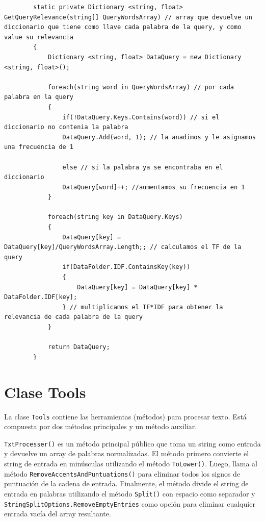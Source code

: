 \documentclass[12pt,a4paper]{report}
\begin{document}
\begin{lstlisting}
        static private Dictionary <string, float> GetQueryRelevance(string[] QueryWordsArray) // array que devuelve un diccionario que tiene como llave cada palabra de la query, y como value su relevancia
        {   
            Dictionary <string, float> DataQuery = new Dictionary <string, float>();

            foreach(string word in QueryWordsArray) // por cada palabra en la query
            {
                if(!DataQuery.Keys.Contains(word)) // si el diccionario no contenia la palabra
                DataQuery.Add(word, 1); // la anadimos y le asignamos una frecuencia de 1
 
                else // si la palabra ya se encontraba en el diccionario
                DataQuery[word]++; //aumentamos su frecuencia en 1
            }

            foreach(string key in DataQuery.Keys)
            {
                DataQuery[key] = DataQuery[key]/QueryWordsArray.Length;; // calculamos el TF de la query
                if(DataFolder.IDF.ContainsKey(key))
                {
                    DataQuery[key] = DataQuery[key] * DataFolder.IDF[key];
                } // multiplicamos el TF*IDF para obtener la relevancia de cada palabra de la query
            }

            return DataQuery;
        }
\end{lstlisting}

\chapter*{Clase Tools}

La clase \texttt{Tools} contiene las herramientas (métodos) para procesar texto. Está compuesta por dos métodos principales y un método auxiliar.\par\bigskip

\texttt{TxtProcesser()} es un método principal público que toma un string como entrada y devuelve un array de palabras normalizadas. El método primero convierte el string de entrada en minúsculas utilizando el método \texttt{ToLower()}. Luego, llama al método \texttt{RemoveAccentsAndPuntuations()} para eliminar todos los signos de puntuación de la cadena de entrada. Finalmente, el método divide el string de entrada en palabras utilizando el método \texttt{Split()} con espacio como separador y \texttt{StringSplitOptions.RemoveEmptyEntries} como opción para eliminar cualquier entrada vacía del array resultante.
\end{document}
